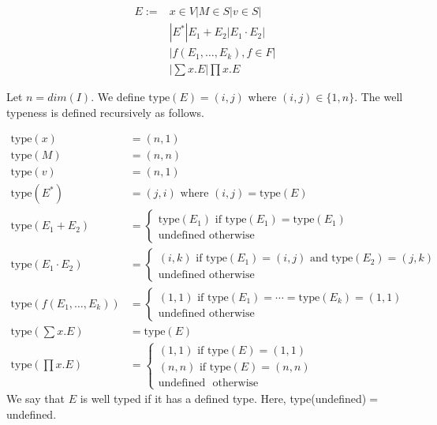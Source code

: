 \begin{align*}
E:=& x\in V | M\in S | v\in S | \\
&|E^*|E_1+E_2 | E_1\cdot E_2 |\\
& |f(E_1,\ldots, E_k), f\in F | \\
& |\sum x. E | \prod x. E
\end{align*}

Let $n=dim(I)$. We define $\text{type}(E)=(i,j)$ where $(i,j)\in \lbrace 1, n\rbrace$. The well typeness is defined recursively as follows.

\begin{align*}
\text{type}(x) &= (n,1) \\
\text{type}(M) &= (n,n) \\
\text{type}(v) &= (n,1) \\
\text{type}(E^*)&=(j,i) \text{ where } (i,j)=\text{type}(E) \\
\text{type}(E_1 + E_2) &= \begin{cases}
               \text{type}(E_1) \text{ if } \text{type}(E_1)=\text{type}(E_1) \\
               \text{undefined} \text{ otherwise }
            \end{cases} \\
\text{type}(E_1\cdot E_2)&=\begin{cases}
               (i,k) \text{ if } \text{type}(E_1)=(i,j)\text{ and type}(E_2)=(j,k) \\
               \text{undefined} \text{ otherwise }
            \end{cases} \\
\text{type}(f(E_1,\ldots, E_k))&=\begin{cases}
               (1,1) \text{ if } \text{type}(E_1)=\cdots =\text{type}(E_k)=(1,1) \\
               \text{undefined} \text{ otherwise }
            \end{cases} \\
\text{type}\left(\sum x.E\right) &= \text{type}(E) \\
\text{type}\left(\prod x. E\right) &=
\begin{cases}
               (1,1) \text{ if } \text{type}(E)=(1,1) \\
               (n,n) \text{ if } \text{type}(E)=(n,n) \\
               \text{undefined } \text{ otherwise }
            \end{cases}
\end{align*}
We say that $E$ is well typed if it has a defined type. Here, type(undefined)$=$ undefined.


